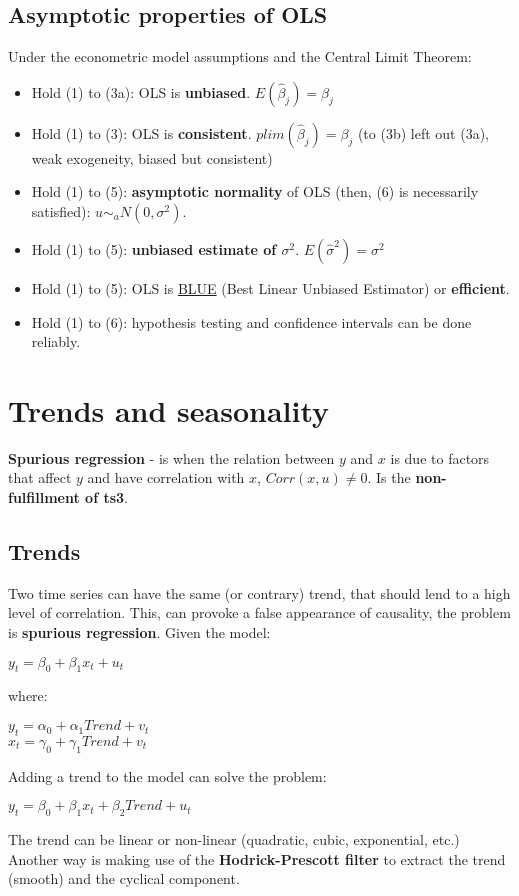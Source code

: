 \documentclass[10pt, a4paper, landscape]{extarticle}
\begin{document}
\begin{multicols}{3}
	\subsection*{Asymptotic properties of OLS}
		Under the econometric model assumptions and the Central Limit Theorem:
		\begin{itemize}[leftmargin=*]
			\item Hold (1) to (3a): OLS is \textbf{unbiased}. $E(\hat{\beta}_j) = \beta_j$
			\item Hold (1) to (3): OLS is \textbf{consistent}. $plim(\hat{\beta}_j) = \beta_j$ (to (3b) left out (3a), weak exogeneity, biased but consistent)
			\item Hold (1) to (5): \textbf{asymptotic normality} of OLS (then, (6) is necessarily satisfied): $u \sim_a N(0,\sigma^2)$.
			\item Hold (1) to (5): \textbf{unbiased estimate of $\sigma^2$}. $E(\hat{\sigma}^2) = \sigma^2$
			\item Hold (1) to (5): OLS is \textcolor{blue}{\href{https://www.youtube.com/watch?v=68ugkg9RePc}{BLUE}} (Best Linear Unbiased Estimator) or \textbf{efficient}. 
			\item Hold (1) to (6): hypothesis testing and confidence intervals can be done reliably.
		\end{itemize}
\columnbreak
\section*{Trends and seasonality}
	\textbf{Spurious regression} - is when the relation between $y$ and $x$ is due to factors that affect $y$ and have correlation with $x$, $Corr(x, u) \neq 0$. Is the \textbf{non-fulfillment of ts3}.
	\subsection*{Trends}
		Two time series can have the same (or contrary) trend, that should lend to a high level of correlation. This, can provoke a false appearance of causality, the problem is \textbf{spurious regression}. Given the model:
		\begin{center}
			$y_t = \beta_0 + \beta_1 x_t + u_t$
		\end{center}
		where:
		\begin{center}
			$y_t = \alpha_0 + \alpha_1 Trend + v_t$
			\\ $x_t = \gamma_0 + \gamma_1 Trend + v_t$
		\end{center}
		Adding a trend to the model can solve the problem:
		\begin{center}
			$y_t = \beta_0 + \beta_1 x_t + \beta_2 Trend + u_t$
		\end{center}
		The trend can be linear or non-linear (quadratic, cubic, exponential, etc.)
		\\ Another way is making use of the \textbf{Hodrick-Prescott filter} to extract the trend (smooth) and the cyclical component.

\end{multicols}
\end{document}
